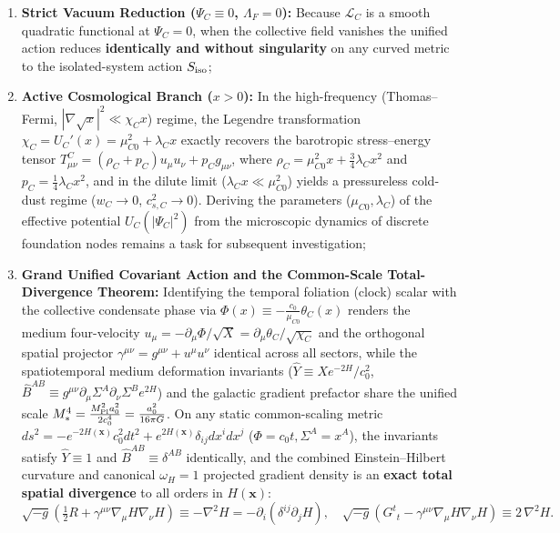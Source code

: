 \documentclass[11pt,a4paper]{article}
\begin{document}
\begin{enumerate}[label=\arabic*.]
\item \textbf{Strict Vacuum Reduction ($\Psi_C \equiv 0$, $\Lambda_F = 0$):} Because $\mathcal{L}_C$ is a smooth quadratic functional at $\Psi_C = 0$, when the collective field vanishes the unified action reduces \textbf{identically and without singularity} on any curved metric to the isolated-system action $S_{\rm iso}$;
\item \textbf{Active Cosmological Branch ($x > 0$):} In the high-frequency (Thomas--Fermi, $|\nabla\sqrt{x}|^2 \ll \chi_C x$) regime, the Legendre transformation $\chi_C = U_C'(x) = \mu_{C0}^2 + \lambda_C x$ exactly recovers the barotropic stress--energy tensor $T^C_{\mu\nu} = (\rho_C + p_C)u_\mu u_\nu + p_C g_{\mu\nu}$, where $\rho_C = \mu_{C0}^2 x + \frac{3}{4}\lambda_C x^2$ and $p_C = \frac{1}{4}\lambda_C x^2$, and in the dilute limit ($\lambda_C x \ll \mu_{C0}^2$) yields a pressureless cold-dust regime ($w_C \to 0$, $c_{s,C}^2 \to 0$). Deriving the parameters ($\mu_{C0}, \lambda_C$) of the effective potential $U_C(|\Psi_C|^2)$ from the microscopic dynamics of discrete foundation nodes remains a task for subsequent investigation;
\item \textbf{Grand Unified Covariant Action and the Common-Scale Total-Divergence Theorem:} Identifying the temporal foliation (clock) scalar with the collective condensate phase via $\Phi(x) \equiv -\frac{c_0}{\mu_{C0}}\theta_C(x)$ renders the medium four-velocity $u_\mu = -\partial_\mu\Phi/\sqrt{X} = \partial_\mu\theta_C/\sqrt{\chi_C}$ and the orthogonal spatial projector $\gamma^{\mu\nu} = g^{\mu\nu} + u^\mu u^\nu$ identical across all sectors, while the spatiotemporal medium deformation invariants ($\widehat{Y} \equiv X e^{-2H}/c_0^2$, $\widehat{B}^{AB} \equiv g^{\mu\nu}\partial_\mu\Sigma^A\partial_\nu\Sigma^B e^{2H}$) and the galactic gradient prefactor share the unified scale $M_*^4 = \frac{M_{\rm Pl}^2 a_0^2}{2 c_0^4} = \frac{a_0^2}{16\pi G}$. On any static common-scaling metric $ds^2 = -e^{-2H(\mathbf{x})}c_0^2 dt^2 + e^{2H(\mathbf{x})}\delta_{ij}dx^i dx^j$ ($\Phi = c_0 t, \Sigma^A = x^A$), the invariants satisfy $\widehat{Y} \equiv 1$ and $\widehat{B}^{AB} \equiv \delta^{AB}$ identically, and the combined Einstein--Hilbert curvature and canonical $\omega_H = 1$ projected gradient density is an \textbf{exact total spatial divergence} to all orders in $H(\mathbf{x})$:
\begin{equation}
\sqrt{-g}\left(\tfrac{1}{2}R + \gamma^{\mu\nu}\nabla_\mu H\nabla_\nu H\right) \equiv -\nabla^2 H = -\partial_i(\delta^{ij}\partial_j H), \quad \sqrt{-g}\left(G^t{}_t - \gamma^{\mu\nu}\nabla_\mu H\nabla_\nu H\right) \equiv 2\,\nabla^2 H.

\end{equation}
\end{enumerate}
\end{document}
